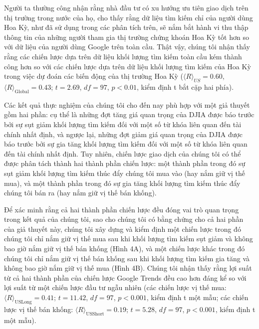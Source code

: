 Người ta thường công nhận rằng nhà đầu tư có xu hướng ưu tiên giao dịch trên thị trường trong nước của họ, cho thấy rằng dữ liệu tìm kiếm chỉ của người dùng Hoa Kỳ, như đã sử dụng trong các phân tích trên, sẽ nắm bắt hành vi thu thập thông tin của những người tham gia thị trường chứng khoán Hoa Kỳ tốt hơn so với dữ liệu của người dùng Google trên toàn cầu. Thật vậy, chúng tôi nhận thấy rằng các chiến lược dựa trên dữ liệu khối lượng tìm kiếm toàn cầu kém thành công hơn so với các chiến lược dựa trên dữ liệu khối lượng tìm kiếm của Hoa Kỳ trong việc dự đoán các biến động của thị trường Hoa Kỳ ($\langle R \rangle_{US} = 0.60$, $\langle R \rangle_{\text{Global}} = 0.43$; $t = 2.69$, $df = 97$, $p < 0.01$, kiểm định t bắt cặp hai phía).

Các kết quả thực nghiệm của chúng tôi cho đến nay phù hợp với một giả thuyết gồm hai phần: cụ thể là những đợt tăng giá quan trọng của DJIA được báo trước bởi sự sụt giảm khối lượng tìm kiếm đối với một số từ khóa liên quan đến tài chính nhất định, và ngược lại, những đợt giảm giá quan trọng của DJIA được báo trước bởi sự gia tăng khối lượng tìm kiếm đối với một số từ khóa liên quan đến tài chính nhất định. Tuy nhiên, chiến lược giao dịch của chúng tôi có thể được phân tách thành hai thành phần chiến lược: một thành phần trong đó sự sụt giảm khối lượng tìm kiếm thúc đẩy chúng tôi mua vào (hay nắm giữ vị thế mua), và một thành phần trong đó sự gia tăng khối lượng tìm kiếm thúc đẩy chúng tôi bán ra (hay nắm giữ vị thế bán khống).

Để xác minh rằng cả hai thành phần chiến lược đều đóng vai trò quan trọng trong kết quả của chúng tôi, sao cho chúng tôi có bằng chứng cho cả hai phần của giả thuyết này, chúng tôi xây dựng và kiểm định một chiến lược trong đó chúng tôi chỉ nắm giữ vị thế mua sau khi khối lượng tìm kiếm sụt giảm và không bao giờ nắm giữ vị thế bán khống (Hình 4A), và một chiến lược khác trong đó chúng tôi chỉ nắm giữ vị thế bán khống sau khi khối lượng tìm kiếm gia tăng và không bao giờ nắm giữ vị thế mua (Hình 4B). Chúng tôi nhận thấy rằng lợi suất từ cả hai thành phần của chiến lược Google Trends đều cao hơn đáng kể so với lợi suất từ một chiến lược đầu tư ngẫu nhiên (các chiến lược vị thế mua: $\langle R \rangle_{\text{USLong}} = 0.41$; $t = 11.42$, $df = 97$, $p < 0.001$, kiểm định t một mẫu; các chiến lược vị thế bán khống: $\langle R \rangle_{\text{USShort}} = 0.19$; $t = 5.28$, $df = 97$, $p < 0.001$, kiểm định t một mẫu).

